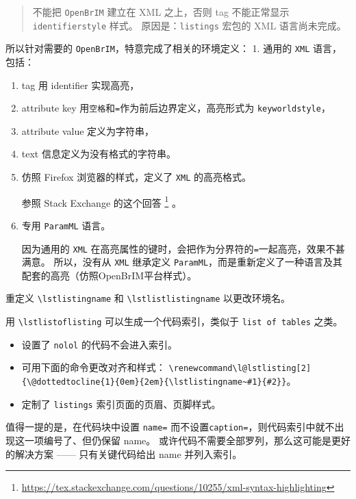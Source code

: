 \documentclass[../Main/thesis.tex]{subfiles}
\begin{document}
\begin{quote}
不能把 \texttt{OpenBrIM} 建立在 XML 之上，否则 tag 不能正常显示
\texttt{identifierstyle} 样式。 原因是：\texttt{listings} 宏包的 XML
语言尚未完成。
\end{quote}

所以针对需要的 \texttt{OpenBrIM}，特意完成了相关的环境定义： 1. 通用的
\texttt{XML} 语言，包括：

\begin{enumerate}
\item
  tag 用 identifier 实现高亮，
\item
  attribute key 用\texttt{空格}和\texttt{=}作为前后边界定义，高亮形式为
  \texttt{keyworldstyle}，
\item
  attribute value 定义为字符串，
\item
  text 信息定义为没有格式的字符串。
\item
  仿照 Firefox 浏览器的样式，定义了 \texttt{XML} 的高亮格式。

  参照 Stack Exchange 的这个回答 \footnote{
    \url{https://tex.stackexchange.com/questions/10255/xml-syntax-highlighting}
  } 。
\item
  专用 \texttt{ParamML} 语言。

  因为通用的 \texttt{XML}
  在高亮属性的键时，会把作为分界符的\texttt{=}一起高亮，效果不甚满意。
  所以，没有从 \texttt{XML} 继承定义
  \texttt{ParamML}，而是重新定义了一种语言及其配套的高亮（仿照OpenBrIM平台样式）。
\end{enumerate}

重定义 \texttt{\textbackslash{}lstlistingname} 和
\texttt{\textbackslash{}lstlistlistingname} 以更改环境名。

用 \texttt{\textbackslash{}lstlistoflisting}
可以生成一个代码索引，类似于 \texttt{list of tables} 之类。
\begin{itemize}[$\bullet$]
  \item 设置了 \texttt{nolol} 的代码不会进入索引。
  \item 可用下面的命令更改对齐和样式：
  \lstinline[language=TongjiLaTeX,
    style=colorEX]|\renewcommand\l@lstlisting[2]{\@dottedtocline{1}{0em}{2em}{\lstlistingname~#1}{#2}}|。
  \item 定制了 \texttt{listings} 索引页面的页眉、页脚样式。
\end{itemize}

值得一提的是，在代码块中设置 \texttt{name=} 而不设置\texttt{caption=}，则代码索引中就不出现这一项编号了、但仍保留 name。
或许代码不需要全部罗列，那么这可能是更好的解决方案 —— 只有关键代码给出 name 并列入索引。
\end{document}
